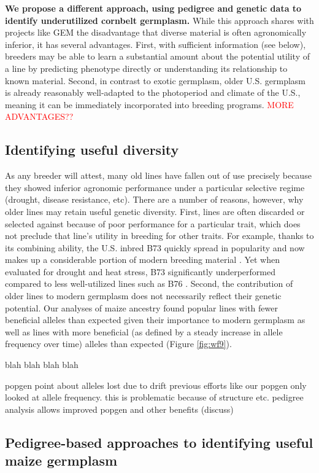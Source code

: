 \documentclass[final,12pt]{article}
\begin{document}
\textbf{We propose a different approach, using pedigree and genetic data to identify underutilized cornbelt germplasm.}  
While this approach shares with projects like GEM the disadvantage that diverse material is often  agronomically inferior, it has several advantages.  
First, with sufficient information (see below), breeders may be able to learn a substantial amount about the potential utility of a line by predicting phenotype directly or understanding its relationship to known material. 
Second, in contrast to exotic germplasm, older U.S. germplasm is already reasonably well-adapted to the photoperiod and climate of the U.S., meaning it can be immediately incorporated into breeding programs.
\textcolor{red}{MORE ADVANTAGES??}

\subsection*{Identifying useful diversity}
As any breeder will attest, many old lines have fallen out of use precisely because they showed inferior agronomic performance under a particular selective regime (drought, disease resistance, etc).
There are a number of reasons, however, why older lines may retain useful genetic diversity.
First, lines are often discarded or selected against because of poor performance for a particular trait, which does not preclude that line's utility in breeding for other traits.
For example, thanks to its combining ability, the U.S. inbred B73 quickly spread in popularity and now makes up a considerable portion of modern breeding material \citep{van2012historical}. 
Yet when evaluated for drought and heat stress, B73 significantly underperformed compared to less well-utilized lines such as B76 \citep{chen2012characterization}.
Second, the contribution of older lines to modern germplasm does not necessarily reflect their genetic potential.
Our analyses of maize ancestry found popular lines with fewer beneficial alleles than expected given their importance to modern germplasm as well as lines with more beneficial (as defined by a steady increase in allele frequency over time) alleles than expected (Figure \ref{fig:wf9}).

blah blah blah blah


 popgen point about alleles lost due to drift
 previous efforts like our popgen only looked at allele frequency. this is problematic because of structure etc.
 pedigree analysis allows improved popgen and other benefits (discuss)
 

\subsection*{Pedigree-based approaches to identifying useful maize germplasm}
\end{document}
